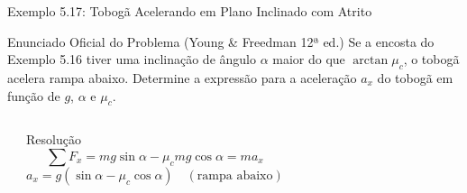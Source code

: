 \documentclass[10pt,aspectratio=169]{beamer}
\begin{document}
\begin{frame}{Exemplo 5.17: Tobogã Acelerando em Plano Inclinado com Atrito}
    \begin{block}{Enunciado Oficial do Problema (Young \& Freedman 12ª ed.)}
        \small
        Se a encosta do Exemplo 5.16 tiver uma inclinação de ângulo $\alpha$ maior do que $\arctan\mu_c$, o tobogã acelera rampa abaixo. Determine a expressão para a aceleração $a_x$ do tobogã em função de $g$, $\alpha$ e $\mu_c$.
    \end{block}
    \begin{columns}[T]
        \begin{center}
        \end{center}
        \begin{exampleblock}{Resolução}
            \small
            $$\sum F_x = mg \sin\alpha - \mu_c mg \cos\alpha = m a_x$$
            $$a_x = g (\sin\alpha - \mu_c \cos\alpha) \quad (\text{rampa abaixo})$$
        \end{exampleblock}
    \end{columns}
\end{frame}
\end{document}

